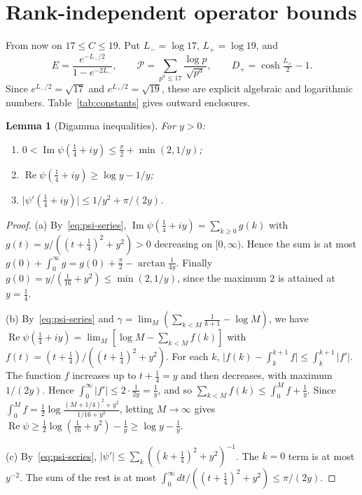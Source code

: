 \documentclass[11pt,a4paper]{article}
\newtheorem{lemma}[theorem]{Lemma}
\theoremstyle{definition}
\newcommand{\abs}[1]{\lvert #1\rvert}
\newcommand{\Lmin}{L_{-}}
\newcommand{\Lmax}{L_{+}}
\DeclareMathOperator{\Ima}{Im}
\DeclareMathOperator{\Rea}{Re}
\begin{document}
\section{Rank-independent operator bounds}\label{sec:operator}

From now on $17\le C\le19$. Put $\Lmin=\log17$, $\Lmax=\log19$, and
\begin{equation}\label{eq:constants}
E=\frac{e^{-\Lmin/2}}{1-e^{-2\Lmin}},\qquad
\mathcal P=\sum_{p^a\le17}\frac{\log p}{\sqrt{p^a}},\qquad
D_{+}=\cosh\tfrac{\Lmax}2-1.
\end{equation}
Since $e^{\Lmin/2}=\sqrt{17}$ and $e^{\Lmax/2}=\sqrt{19}$, these are explicit
algebraic and logarithmic numbers. Table~\ref{tab:constants} gives outward
enclosures.

\begin{lemma}[Digamma inequalities]\label{lem:digamma}
For $y>0$:
\begin{enumerate}[label=\textup{(\alph*)}]
\item $0<\Ima\psi(\tfrac14+iy)\le\tfrac\pi2+\min(2,1/y)$;
\item $\Rea\psi(\tfrac14+iy)\ge\log y-1/y$;
\item $\abs{\psi'(\tfrac14+iy)}\le 1/y^2+\pi/(2y)$.
\end{enumerate}
\end{lemma}

\begin{proof}
(a) By~\eqref{eq:psi-series},
$\Ima\psi(\frac14+iy)=\sum_{k\ge0}g(k)$ with $g(t)=y/((t+\frac14)^2+y^2)>0$
decreasing on $[0,\infty)$. Hence the sum is at most
$g(0)+\int_0^\infty g=g(0)+\frac\pi2-\arctan\frac1{4y}$. Finally
$g(0)=y/(\frac1{16}+y^2)\le\min(2,1/y)$, since the maximum $2$ is attained
at $y=\frac14$.

(b) By~\eqref{eq:psi-series} and $\gamma=\lim_M(\sum_{k<M}\frac1{k+1}-\log M)$,
we have $\Rea\psi(\frac14+iy)=\lim_M[\log M-\sum_{k<M}f(k)]$ with
$f(t)=(t+\frac14)/((t+\frac14)^2+y^2)$. For each $k$,
$\abs{f(k)-\int_k^{k+1}f}\le\int_k^{k+1}\abs{f'}$. The function $f$ increases
up to $t+\frac14=y$ and then decreases, with maximum $1/(2y)$. Hence
$\int_0^\infty\abs{f'}\le 2\cdot\frac1{2y}=\frac1y$, and so
$\sum_{k<M}f(k)\le\int_0^Mf+\frac1y$. Since
$\int_0^Mf=\frac12\log\frac{(M+1/4)^2+y^2}{1/16+y^2}$, letting $M\to\infty$
gives $\Rea\psi\ge\frac12\log(\frac1{16}+y^2)-\frac1y\ge\log y-\frac1y$.

(c) By~\eqref{eq:psi-series},
$\abs{\psi'}\le\sum_k((k+\frac14)^2+y^2)^{-1}$. The $k=0$ term is at most
$y^{-2}$. The sum of the rest is at most
$\int_0^\infty dt/((t+\frac14)^2+y^2)\le\pi/(2y)$.
\end{proof}
\end{document}
